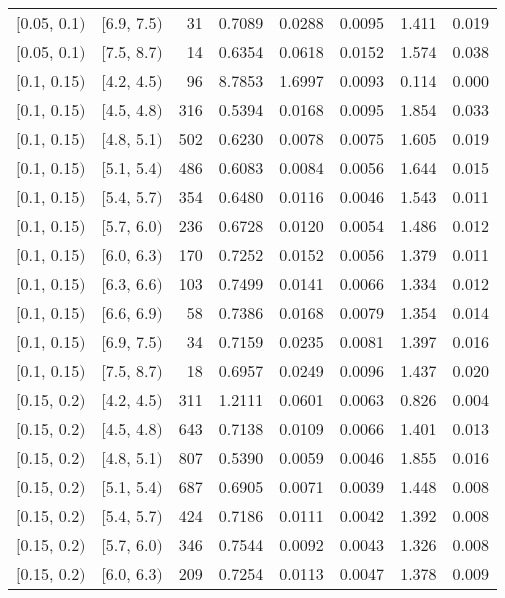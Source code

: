 \begin{longtable}{| l | l | r | r | r | r | r | r |}
        $[$0.05, 0.1$)$ & $[$6.9, 7.5$)$ & 31 & 0.7089 & 0.0288 & 0.0095 & 1.411 & 0.019 \\
        $[$0.05, 0.1$)$ & $[$7.5, 8.7$)$ & 14 & 0.6354 & 0.0618 & 0.0152 & 1.574 & 0.038 \\
        $[$0.1, 0.15$)$ & $[$4.2, 4.5$)$ & 96 & 8.7853 & 1.6997 & 0.0093 & 0.114 & 0.000 \\
        $[$0.1, 0.15$)$ & $[$4.5, 4.8$)$ & 316 & 0.5394 & 0.0168 & 0.0095 & 1.854 & 0.033 \\
        $[$0.1, 0.15$)$ & $[$4.8, 5.1$)$ & 502 & 0.6230 & 0.0078 & 0.0075 & 1.605 & 0.019 \\
        $[$0.1, 0.15$)$ & $[$5.1, 5.4$)$ & 486 & 0.6083 & 0.0084 & 0.0056 & 1.644 & 0.015 \\
        $[$0.1, 0.15$)$ & $[$5.4, 5.7$)$ & 354 & 0.6480 & 0.0116 & 0.0046 & 1.543 & 0.011 \\
        $[$0.1, 0.15$)$ & $[$5.7, 6.0$)$ & 236 & 0.6728 & 0.0120 & 0.0054 & 1.486 & 0.012 \\
        $[$0.1, 0.15$)$ & $[$6.0, 6.3$)$ & 170 & 0.7252 & 0.0152 & 0.0056 & 1.379 & 0.011 \\
        $[$0.1, 0.15$)$ & $[$6.3, 6.6$)$ & 103 & 0.7499 & 0.0141 & 0.0066 & 1.334 & 0.012 \\
        $[$0.1, 0.15$)$ & $[$6.6, 6.9$)$ & 58 & 0.7386 & 0.0168 & 0.0079 & 1.354 & 0.014 \\
        $[$0.1, 0.15$)$ & $[$6.9, 7.5$)$ & 34 & 0.7159 & 0.0235 & 0.0081 & 1.397 & 0.016 \\
        $[$0.1, 0.15$)$ & $[$7.5, 8.7$)$ & 18 & 0.6957 & 0.0249 & 0.0096 & 1.437 & 0.020 \\
        $[$0.15, 0.2$)$ & $[$4.2, 4.5$)$ & 311 & 1.2111 & 0.0601 & 0.0063 & 0.826 & 0.004 \\
        $[$0.15, 0.2$)$ & $[$4.5, 4.8$)$ & 643 & 0.7138 & 0.0109 & 0.0066 & 1.401 & 0.013 \\
        $[$0.15, 0.2$)$ & $[$4.8, 5.1$)$ & 807 & 0.5390 & 0.0059 & 0.0046 & 1.855 & 0.016 \\
        $[$0.15, 0.2$)$ & $[$5.1, 5.4$)$ & 687 & 0.6905 & 0.0071 & 0.0039 & 1.448 & 0.008 \\
        $[$0.15, 0.2$)$ & $[$5.4, 5.7$)$ & 424 & 0.7186 & 0.0111 & 0.0042 & 1.392 & 0.008 \\
        $[$0.15, 0.2$)$ & $[$5.7, 6.0$)$ & 346 & 0.7544 & 0.0092 & 0.0043 & 1.326 & 0.008 \\
        $[$0.15, 0.2$)$ & $[$6.0, 6.3$)$ & 209 & 0.7254 & 0.0113 & 0.0047 & 1.378 & 0.009 \\

\end{longtable}
